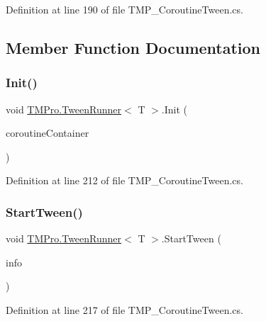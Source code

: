 Definition at line 190 of file T\+M\+P\+\_\+\+Coroutine\+Tween.\+cs.



\subsection{Member Function Documentation}
\mbox{\label{class_t_m_pro_1_1_tween_runner_a7af4db815f3367dbab643a84e6680916}} 
\subsubsection{\texorpdfstring{Init()}{Init()}}
{\footnotesize\ttfamily void \mbox{\hyperlink{class_t_m_pro_1_1_tween_runner}{T\+M\+Pro.\+Tween\+Runner}}$<$ T $>$.Init (\begin{DoxyParamCaption}\item[{Mono\+Behaviour}]{coroutine\+Container }\end{DoxyParamCaption})}



Definition at line 212 of file T\+M\+P\+\_\+\+Coroutine\+Tween.\+cs.

\mbox{\label{class_t_m_pro_1_1_tween_runner_ac433f6e5ac92706935adf751b482231d}} 
\subsubsection{\texorpdfstring{StartTween()}{StartTween()}}
{\footnotesize\ttfamily void \mbox{\hyperlink{class_t_m_pro_1_1_tween_runner}{T\+M\+Pro.\+Tween\+Runner}}$<$ T $>$.Start\+Tween (\begin{DoxyParamCaption}\item[{T}]{info }\end{DoxyParamCaption})}



Definition at line 217 of file T\+M\+P\+\_\+\+Coroutine\+Tween.\+cs.

\mbox{\label{class_t_m_pro_1_1_tween_runner_a9f415377a8d07a95d65c68ea400b1c72}} 
